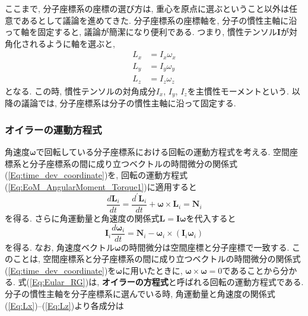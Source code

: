 ここまで, 分子座標系の座標の選び方は, 重心を原点に選ぶということ以外は任意であるとして議論を進めてきた. 分子座標系の座標軸を, 分子の慣性主軸に沿って軸を固定すると, 議論が簡潔になり便利である. つまり, 慣性テンソル$\bm{I}$が対角化されるように軸を選ぶと,
\begin{align}
  L_{x} &= I_{x} \omega_{x} \label{Eq:Lx} \\
  L_{y} &= I_{y} \omega_{y} \label{Eq:Ly} \\
  L_{z} &= I_{z} \omega_{z} \label{Eq:Lz}
\end{align}
となる. 
この時, 慣性テンソルの対角成分$I_{x}$, $I_{y}$, $I_{z}$を主慣性モーメントという.
以降の議論では, 分子座標系は分子の慣性主軸に沿って固定する.

\subsubsection{オイラーの運動方程式}
角速度$\bm{\omega}$で回転している分子座標系における回転の運動方程式を考える.
空間座標系と分子座標系の間に成り立つベクトルの時間微分の関係式(\ref{Eq:time_dev_coordinate})を, 回転の運動方程式(\ref{Eq:EoM_AngularMoment_Torque1})に適用すると
\begin{equation}
  \frac{d \bm{L}_{i}}{dt}
  =
  \frac{d^{\prime} \bm{L}_{i}}{dt}
  +
  \bm{\omega} \times \bm{L}_{i}
  =
  \bm{N}_{i}
\end{equation}
を得る. 
さらに角運動量と角速度の関係式$\bm{L} = \bm{I} \bm{\omega}$を代入すると
\begin{equation}
  \bm{I}_{i} \frac{d \bm{\omega}_{i}}{dt}
  =
  \bm{N}_{i}
  -
  \bm{\omega}_{i} \times (\bm{I}_{i} \bm{\omega}_{i})
  \label{Eq:Eular_RG}
\end{equation}
を得る. なお, 角速度ベクトル$\bm{\omega}$の時間微分は空間座標と分子座標で一致する. このことは, 空間座標系と分子座標系の間に成り立つベクトルの時間微分の関係式(\ref{Eq:time_dev_coordinate})を$\bm{\omega}$に用いたときに, $\bm{\omega} \times \bm{\omega} = 0$であることから分かる.
式(\ref{Eq:Eular_RG})は, \textbf{オイラーの方程式}と呼ばれる回転の運動方程式である. 
分子の慣性主軸を分子座標系に選んでいる時, 角運動量と角速度の関係式(\ref{Eq:Lx})--(\ref{Eq:Lz})より各成分は
